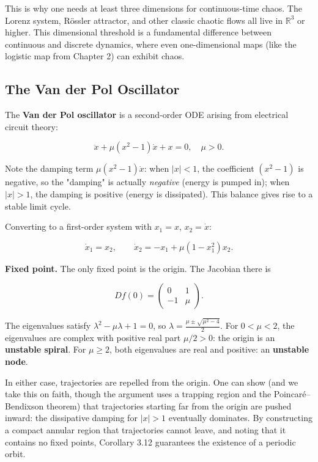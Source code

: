 This is why one needs at least three dimensions for continuous-time chaos. The Lorenz system, R\"ossler attractor, and other classic chaotic flows all live in $\mathbb{R}^3$ or higher. This dimensional threshold is a fundamental difference between continuous and discrete dynamics, where even one-dimensional maps (like the logistic map from Chapter 2) can exhibit chaos.

\subsection{The Van der Pol Oscillator}\label{sec:3.6.4}

The \textbf{Van der Pol oscillator} is a second-order ODE arising from electrical circuit theory:

\begin{equation}\label{eq:3.9}\tag{3.9}
\ddot{x} + \mu(x^2 - 1)\dot{x} + x = 0, \quad \mu > 0.
\end{equation}

Note the damping term $\mu(x^2 - 1)\dot{x}$: when $|x| < 1$, the coefficient $(x^2 - 1)$ is negative, so the "damping" is actually \textit{negative} (energy is pumped in); when $|x| > 1$, the damping is positive (energy is dissipated). This balance gives rise to a stable limit cycle.

Converting to a first-order system with $x_1 = x$, $x_2 = \dot{x}$:

\[
\dot{x}_1 = x_2, \qquad \dot{x}_2 = -x_1 + \mu(1 - x_1^2) x_2.
\]

\textbf{Fixed point.} The only fixed point is the origin. The Jacobian there is

\[
Df(0) = \begin{pmatrix} 0 & 1 \\ -1 & \mu \end{pmatrix}.
\]

The eigenvalues satisfy $\lambda^2 - \mu\lambda + 1 = 0$, so $\lambda = \frac{\mu \pm \sqrt{\mu^2 - 4}}{2}$. For $0 < \mu < 2$, the eigenvalues are complex with positive real part $\mu/2 > 0$: the origin is an \textbf{unstable spiral}. For $\mu \geq 2$, both eigenvalues are real and positive: an \textbf{unstable node}.

In either case, trajectories are repelled from the origin. One can show (and we take this on faith, though the argument uses a trapping region and the Poincar\'e--Bendixson theorem) that trajectories starting far from the origin are pushed inward: the dissipative damping for $|x| > 1$ eventually dominates. By constructing a compact annular region that trajectories cannot leave, and noting that it contains no fixed points, Corollary 3.12 guarantees the existence of a periodic orbit.

